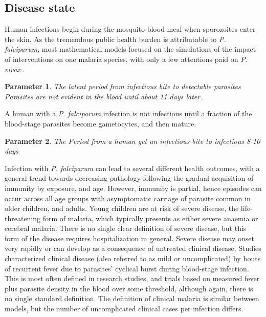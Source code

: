 \documentclass[a4paper, 12pt, twoside]{article}
\newtheorem{parameter}{Parameter}
\begin{document}
\subsection{Disease state}
Human infections begin during the mosquito blood meal when sporozoites enter the skin.
As the tremendous public health burden is attributable to \textit{P. falciparum}, most mathematical models focused on the simulations of the impact of interventions on one malaria species, with only a few attentions paid on \textit{P. vivax} \cite{White2018b} .

\begin{parameter}
	{The latent period from infectious bite to detectable parasites}
	Parasites are not evident in the blood until about 11 days later.
\end{parameter}

A human with a \textit{P. falciparum} infection is not infectious until a fraction of the blood-stage parasites become gametocytes, and then mature.

\begin{parameter}
	{The Period from a human get an infectious bite to infectious}
	{8-10 days}
\end{parameter}

Infection with \textit{P. falciparum} can lead to several different health outcomes, with a general trend towards decreasing pathology following the gradual acquisition of immunity by exposure, and age.
However, immunity is partial, hence episodes can occur across all age groups with asymptomatic carriage of parasite common in older children, and adults.
Young children are at risk of severe disease, the life-threatening form of malaria, which typically presents as either severe anaemia or cerebral malaria.
There is no single clear definition of severe disease, but this form of the disease requires hospitalization in general.
Severe disease may onset very rapidly or can develop as a consequence of untreated clinical disease.
Studies characterized clinical disease (also referred to as mild or uncomplicated)  by bouts of recurrent fever due to parasites' cyclical burst during blood-stage infection.
This is most often defined in research studies, and trials based on measured fever plus parasite density in the blood over some threshold, although again, there is no single standard definition.
The definition of clinical malaria is similar between models, but the number of uncomplicated clinical cases per infection differs.
\end{document}
